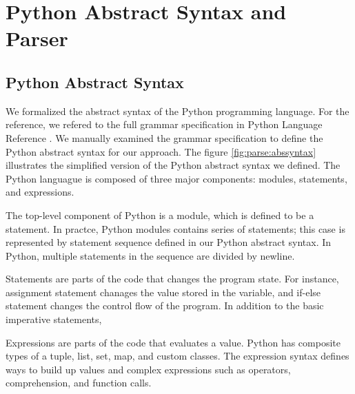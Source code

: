 \section{Python Abstract Syntax and Parser}\label{sec:pysyn}
\subsection{Python Abstract Syntax}

We formalized the abstract syntax of the Python programming language.
For the reference, we refered to the full grammar specification in
Python Language Reference \cite{pythonref}. 
We manually examined the grammar specification 
to define the Python abstract syntax for our approach.
The figure \ref{fig:parse:abssyntax} illustrates the simplified
version of the Python abstract syntax we defined.
The Python languague is composed of three major components:
modules, statements, and expressions.

The top-level component of Python is a module, 
which is defined to be a statement.
In practce, Python modules contains series of statements;
this case is represented by statement sequence defined in our
Python abstract syntax.
In Python, multiple statements in the sequence are divided by newline. 

Statements are parts of the code that changes the program state.
For instance, assignment statement chanages the
value stored in the variable, and if-else statement changes
the control flow of the program.
In addition to the basic imperative statements,

Expressions are parts of the code that evaluates a value.
Python has composite types of a tuple, list, set, map, and custom classes.
The expression syntax defines ways to build up values
and complex expressions such as operators, comprehension, and function calls. 


